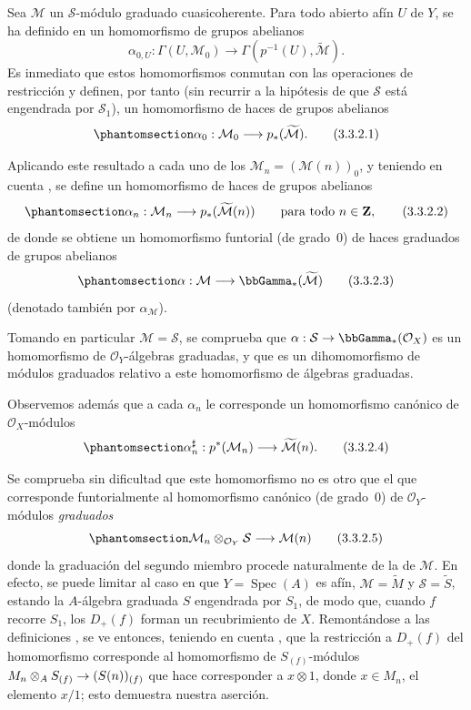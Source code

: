 \documentclass[oneside,10pt]{amsart}
\makeatletter
\newcommand{\ega@arrow}[2]{\mathchoice{#1}{#2}{#2}{#2}}
\renewcommand{\to}{\ega@arrow{\longrightarrow}{\rightarrow}}
\newcommand{\oldpage}[2][]{\marginnote{\normalfont\footnotesize\textbf{#1}~|~#2}\ignorespaces}
\let\EGAOriginalLabel\label
\renewcommand{\label}[1]{\phantomsection\EGAOriginalLabel{#1}}
\makeatother
\begin{document}
\begin{env}[3.3.2]
\label{II.3.3.2-fr}
Sea $\mathcal{M}$ un $\mathcal{S}$-módulo graduado cuasicoherente.
Para todo abierto afín $U$ de $Y$, se ha definido en  un homomorfismo de grupos abelianos
\[
  \alpha_{0,U}:\Gamma(U,\mathcal{M}_0)
  \longrightarrow\Gamma(p^{-1}(U),\widetilde{\mathcal{M}}).
\]
Es inmediato que estos homomorfismos conmutan con las operaciones de restricción  y definen, por tanto (sin recurrir a la hipótesis de que $\mathcal{S}$ está engendrada por $\mathcal{S}_1$), un homomorfismo de haces de grupos abelianos
\[
\label{II.3.3.2.1-fr}
  \alpha_0:\mathcal{M}_0\longrightarrow p_*(\widetilde{\mathcal{M}}).
\tag{3.3.2.1}
\]

Aplicando este resultado a cada uno de los $\mathcal{M}_n=(\mathcal{M}(n))_0$, y teniendo en cuenta , se define un homomorfismo de haces de grupos abelianos
\[
\label{II.3.3.2.2-fr}
  \alpha_n:\mathcal{M}_n\longrightarrow
  p_*(\widetilde{\mathcal{M}}(n))
  \qquad\text{para todo }n\in\mathbf{Z},
\tag{3.3.2.2}
\]
de donde se obtiene un homomorfismo funtorial (de grado~$0$) de haces graduados de grupos abelianos
\[
\label{II.3.3.2.3-fr}
  \alpha:\mathcal{M}\longrightarrow\bbGamma_*(\widetilde{\mathcal{M}})
\tag{3.3.2.3}
\]
(denotado también por $\alpha_{\mathcal{M}}$).

Tomando en particular $\mathcal{M}=\mathcal{S}$, se comprueba que $\alpha:\mathcal{S}\to\bbGamma_*(\mathcal{O}_X)$ es un homomorfismo de $\mathcal{O}_Y$-álgebras graduadas, y que  es un dihomomorfismo de módulos graduados relativo a este homomorfismo de álgebras graduadas.

Observemos además que a cada $\alpha_n$ le corresponde  un homomorfismo canónico de $\mathcal{O}_X$-módulos
\[
\label{II.3.3.2.4-fr}
  \alpha_n^\sharp:p^*(\mathcal{M}_n)
  \longrightarrow\widetilde{\mathcal{M}}(n).
\tag{3.3.2.4}
\]

Se comprueba sin dificultad que este homomorfismo no es otro que el que corresponde funtorialmente  al homomorfismo canónico (de grado~$0$) de $\mathcal{O}_Y$-módulos \emph{graduados}
\[
\label{II.3.3.2.5-fr}
  \mathcal{M}_n\otimes_{\mathcal{O}_Y}\mathcal{S}
  \longrightarrow\mathcal{M}(n)
\tag{3.3.2.5}
\]
\oldpage[II]{58}
donde la graduación del segundo miembro procede naturalmente de la de $\mathcal{M}$.
En efecto, se puede limitar al caso en que $Y=\operatorname{Spec}(A)$ es afín, $\mathcal{M}=\widetilde{M}$ y $\mathcal{S}=\widetilde{S}$, estando la $A$-álgebra graduada $S$ engendrada por $S_1$, de modo que, cuando $f$ recorre $S_1$, los $D_+(f)$ forman un recubrimiento de $X$.
Remontándose a las definiciones , se ve entonces, teniendo en cuenta , que la restricción a $D_+(f)$ del homomorfismo  corresponde  al homomorfismo de $S_{(f)}$-módulos
$M_n\otimes_A S_{(f)}\to(S(n))_{(f)}$
que hace corresponder a $x\otimes1$, donde $x\in M_n$, el elemento $x/1$; esto demuestra nuestra aserción.
\end{env}
\end{document}
